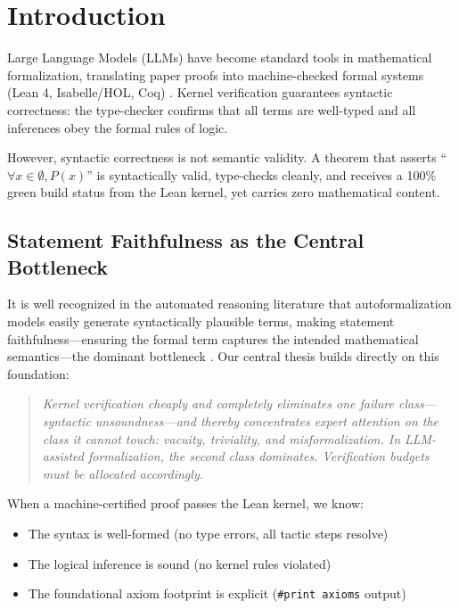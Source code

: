 \documentclass[11pt,a4paper]{article}
\theoremstyle{definition}
\theoremstyle{remark}
\begin{document}
\section{Introduction}
\label{sec:intro}

Large Language Models (LLMs) have become standard tools in mathematical formalization, translating paper proofs into machine-checked formal systems (Lean 4, Isabelle/HOL, Coq) \cite{MouraUllrich2021}. Kernel verification guarantees syntactic correctness: the type-checker confirms that all terms are well-typed and all inferences obey the formal rules of logic.

However, syntactic correctness is not semantic validity. A theorem that asserts ``$\forall x \in \emptyset, P(x)$'' is syntactically valid, type-checks cleanly, and receives a 100\% green build status from the Lean kernel, yet carries zero mathematical content.

\subsection{Statement Faithfulness as the Central Bottleneck}

It is well recognized in the automated reasoning literature that autoformalization models easily generate syntactically plausible terms, making statement faithfulness---ensuring the formal term captures the intended mathematical semantics---the dominant bottleneck \cite{Zheng2021,Azerbayev2023,Buzzard2022}. Our central thesis builds directly on this foundation:
\begin{quote}
\emph{Kernel verification cheaply and completely eliminates one failure class---syntactic unsoundness---and thereby concentrates expert attention on the class it cannot touch: vacuity, triviality, and misformalization. In LLM-assisted formalization, the second class dominates. Verification budgets must be allocated accordingly.}
\end{quote}

When a machine-certified proof passes the Lean kernel, we know:
\begin{itemize}[leftmargin=2em]
  \item The syntax is well-formed (no type errors, all tactic steps resolve)
  \item The logical inference is sound (no kernel rules violated)
  \item The foundational axiom footprint is explicit (\texttt{\#print axioms} output)
\end{itemize}
\end{document}
